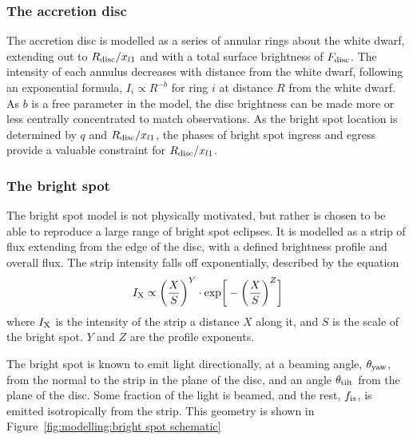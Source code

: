 \subsubsection{The accretion disc}

The accretion disc is modelled as a series of annular rings about the white dwarf, extending out to $R_{\rm disc} / x_{l1}$ and with a total surface brightness of $F_{\rm disc}$. The intensity of each annulus decreases with distance from the white dwarf, following an exponential formula, $I_i \propto R^{-b}$ for ring $i$ at distance $R$ from the white dwarf. As $b$ is a free parameter in the model, the disc brightness can be made more or less centrally concentrated to match observations. As the bright spot location is determined by $q$ and $R_{\rm disc} / x_{l1}$, the phases of bright spot ingress and egress provide a valuable constraint for $R_{\rm disc} / x_{l1}$.

\subsubsection{The bright spot}

The bright spot model is not physically motivated, but rather is chosen to be able to reproduce a large range of bright spot eclipses.
It is modelled as a strip of flux extending from the edge of the disc, with a defined brightness profile and overall flux. The strip intensity falls off exponentially, described by the equation
\begin{equation}
    I_{\rm X} \propto \bigg ( \frac{X}{S} \bigg )^Y \cdot {\rm exp} \bigg [ - \bigg (\frac{X}{S} \bigg )^Z \bigg]
\end{equation}
where $I_{\rm X}$ is the intensity of the strip a distance $X$ along it, and $S$ is the scale of the bright spot. $Y$ and $Z$ are the profile exponents.

The bright spot is known to emit light directionally, at a beaming angle, $\theta_{\rm yaw}$, from the normal to the strip in the plane of the disc, and an angle $\theta_{\rm tilt}$ from the plane of the disc.
Some fraction of the light is beamed, and the rest, $f_{\rm is}$, is emitted isotropically from the strip. This geometry is shown in Figure~\ref{fig:modelling:bright spot schematic}

